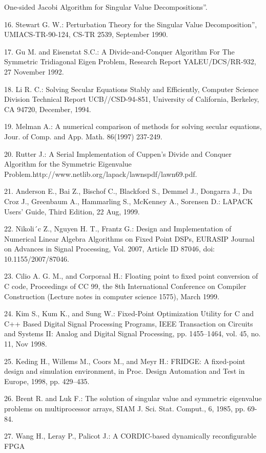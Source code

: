One-sided Jacobi Algorithm for Singular Value Decompositions”.\par
16. Stewart G. W.: Perturbation Theory for the Singular Value Decomposition”,
UMIACS-TR-90-124, CS-TR 2539, September 1990.\par
17. Gu M. and Eisenstat S.C.: A Divide-and-Conquer Algorithm For The Symmetric
Tridiagonal Eigen Problem, Research Report YALEU/DCS/RR-932, 27 November
1992.\par
18. Li R. C.: Solving Secular Equations Stably and Efficiently, Computer Science Division
Technical Report UCB//CSD-94-851, University of California, Berkeley, CA
94720, December, 1994.\par
19. Melman A.: A numerical comparison of methods for solving secular equations,
Jour. of Comp. and App. Math. 86(1997) 237-249.\par
20. Rutter J.: A Serial Implementation of Cuppen’s Divide
and Conquer Algorithm for the Symmetric Eigenvalue
Problem.http://www.netlib.org/lapack/lawnspdf/lawn69.pdf.\par
21. Anderson E., Bai Z., Bischof C., Blackford S., Demmel J., Dongarra J., Du Croz
J., Greenbaum A., Hammarling S., McKenney A., Sorensen D.: LAPACK Users’
Guide, Third Edition, 22 Aug, 1999.\par
22. Nikoli´c Z., Nguyen H. T., Frantz G.: Design and Implementation of Numerical
Linear Algebra Algorithms on Fixed Point DSPs, EURASIP Journal on Advances
in Signal Processing, Vol. 2007, Article ID 87046, doi: 10.1155/2007/87046.\par
23. Cilio A. G. M., and Corporaal H.: Floating point to fixed point conversion of C
code, Proceedings of CC 99, the 8th International Conference on Compiler Construction
(Lecture notes in computer science 1575), March 1999.\par
24. Kim S., Kum K., and Sung W.: Fixed-Point Optimization Utility for C and C++
Based Digital Signal Processing Programs, IEEE Transaction on Circuits and Systems
II: Analog and Digital Signal Processing, pp. 1455–1464, vol. 45, no. 11, Nov
1998.\par
25. Keding H., Willems M., Coors M., and Meyr H.: FRIDGE: A fixed-point design
and simulation environment, in Proc. Design Automation and Test in Europe,
1998, pp. 429–435.\par
26. Brent R. and Luk F.: The solution of singular value and symmetric eigenvalue
problems on multiprocessor arrays, SIAM J. Sci. Stat. Comput., 6, 1985, pp. 69-
84.\par
27. Wang H., Leray P., Palicot J.: A CORDIC-based dynamically reconfigurable FPGA
